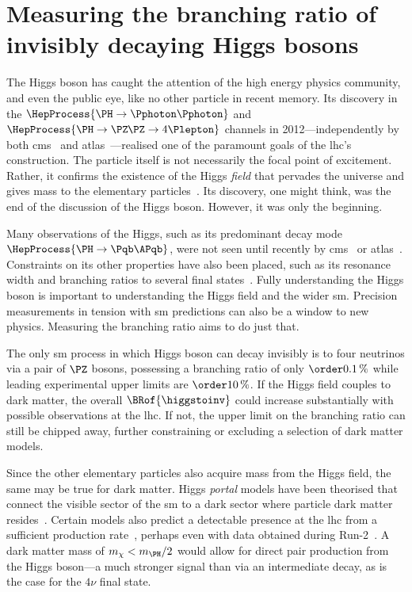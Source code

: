 \section{Measuring the branching ratio of invisibly decaying Higgs bosons}
\label{sec:theory_higgs_to_inv}

The Higgs boson has caught the attention of the high energy physics community, and even the public eye, like no other particle in recent memory. Its discovery in the $\HepProcess{\PH \to \Pphoton\Pphoton}$ and $\HepProcess{\PH \to \PZ\mkern-1mu\PZ \to \text{4}\Plepton}$ channels in 2012---independently by both \acrshort{cms}~\cite{Chatrchyan:2012xdj} and \acrshort{atlas}~\cite{Aad:2012tfa}---realised one of the paramount goals of the \acrshort{lhc}'s construction. The particle itself is not necessarily the focal point of excitement. Rather, it confirms the existence of the Higgs \emph{field} that pervades the universe and gives mass to the elementary particles~\cite{PhysRevLett.13.321,PhysRevLett.13.508,PhysRevLett.13.585}. Its discovery, one might think, was the end of the discussion of the Higgs boson. However, it was only the beginning.

Many observations of the Higgs, such as its predominant decay mode $\HepProcess{\PH \to \Pqb\APqb}$, were not seen until recently by \acrshort{cms}~\cite{Sirunyan:2018kst} or \acrshort{atlas}~\cite{Aaboud:2018zhk}. Constraints on its other properties have also been placed, such as its resonance width and branching ratios to several final states~\cite{PhysRevD.98.030001}. Fully understanding the Higgs boson is important to understanding the Higgs field and the wider \acrlong{sm}. Precision measurements in tension with \acrshort{sm} predictions can also be a window to new physics. Measuring the \higgstoinv branching ratio aims to do just that.

The only \acrshort{sm} process in which Higgs boson can decay invisibly is to four neutrinos via a pair of $\PZ$ bosons, possessing a branching ratio of only $\order{\text{0.1\,\%}}$ while leading experimental upper limits are $\order{\text{10\,\%}}$. If the Higgs field couples to dark matter, the overall $\BRof{\higgstoinv}$ could increase substantially with possible observations at the \acrshort{lhc}. If not, the upper limit on the branching ratio can still be chipped away, further constraining or excluding a selection of dark matter models. 

Since the other elementary particles also acquire mass from the Higgs field, the same may be true for dark matter. Higgs \emph{portal} models have been theorised that connect the visible sector of the \acrlong{sm} to a dark sector where particle dark matter resides~\cite{higgs_portal_singlet_dm,Arcadi:2019lka}. Certain models also predict a detectable presence at the \acrshort{lhc} from a sufficient production rate~\cite{Boveia:2018yeb}, perhaps even with data obtained during Run-2~\cite{Abercrombie:2015wmb}. A dark matter mass of $m_{\chi} < m_{\PH}/\text{2}$ would allow for direct pair production from the Higgs boson---a much stronger signal than via an intermediate decay, as is the case for the $\text{4}\nu$ final state.

